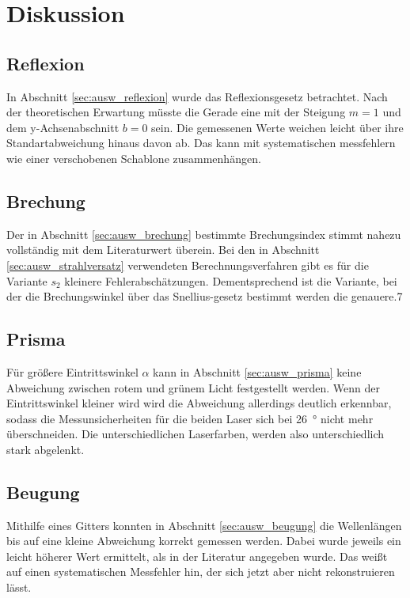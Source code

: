 \section{Diskussion}
\subsection{Reflexion}
In Abschnitt \ref{sec:ausw_reflexion} wurde das Reflexionsgesetz betrachtet.
Nach der theoretischen Erwartung müsste die Gerade eine mit der Steigung $m = 1$ und dem y-Achsenabschnitt $b=0$ sein.
Die gemessenen Werte weichen leicht über ihre Standartabweichung hinaus davon ab.
Das kann mit systematischen messfehlern wie einer verschobenen Schablone zusammenhängen.

\subsection{Brechung}
Der in Abschnitt \ref{sec:ausw_brechung} bestimmte Brechungsindex stimmt nahezu vollständig mit dem Literaturwert überein.
Bei den in Abschnitt \ref{sec:ausw_strahlversatz} verwendeten Berechnungsverfahren gibt es für die Variante $s_2$ kleinere Fehlerabschätzungen.
Dementsprechend ist die Variante, bei der die Brechungswinkel über das Snellius-gesetz bestimmt werden die genauere.7

\subsection{Prisma}
Für größere Eintrittswinkel $\alpha$ kann in Abschnitt \ref{sec:ausw_prisma} keine Abweichung zwischen rotem und grünem Licht festgestellt werden.
Wenn der Eintrittswinkel kleiner wird wird die Abweichung allerdings deutlich erkennbar, sodass die Messunsicherheiten
für die beiden Laser sich bei \qty{26}{\degree} nicht mehr überschneiden.
Die unterschiedlichen Laserfarben, werden also unterschiedlich stark abgelenkt.

\subsection{Beugung}
Mithilfe eines Gitters konnten in Abschnitt \ref{sec:ausw_beugung} die Wellenlängen bis auf eine kleine Abweichung korrekt gemessen werden.
Dabei wurde jeweils ein leicht höherer Wert ermittelt, als in der Literatur angegeben wurde.
Das weißt auf einen systematischen Messfehler hin, der sich jetzt aber nicht rekonstruieren lässt.
